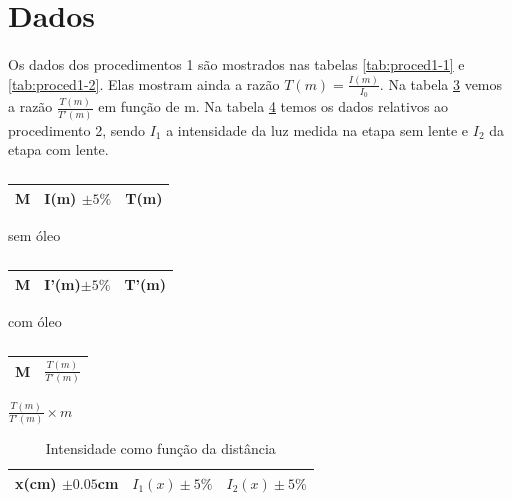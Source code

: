 \documentclass[a4paper,11pt]{article}
\begin{document}
\section{Dados}
\paragraph{}Os dados dos procedimentos 1 são mostrados nas tabelas \ref{tab:proced1-1} e \ref{tab:proced1-2}. Elas mostram ainda a razão $T(m) = \frac{I(m)}{I_0}$. Na tabela \ref{tab:proced1-3} vemos a razão $\frac{T(m)}{T'(m)}$ em função de m. Na tabela \ref{tal:proced2-1} temos os dados relativos ao procedimento 2, sendo $I_1$ a intensidade da luz medida na etapa sem lente e $I_2$ da etapa com lente.

\begin{table}[!htp]
\centering
	\begin{minipage}{0.3\textwidth}
			\begin{tabular}{|c|c|c|} \hline
				M & I(m) $\pm 5 \% $ & T(m) \\ \hline
				
			\end{tabular}
			\caption{sem óleo}	
			\label{tab:proced1-1}
	\end{minipage}
	\hspace{1.0 cm}
	\begin{minipage}{0.3\textwidth}
			\begin{tabular}{|c|c|c|}\hline
			M & I'(m)$ \pm 5\% $ & T'(m) \\ \hline
			
			\end{tabular}
			\caption{com óleo}
			\label{tab:proced1-2}
	\end{minipage}

\hspace{-4.5 cm}
	\begin{minipage}{0.3\textwidth}
			\begin{tabular}{|c|c|}\hline
			M & $\frac{T(m)}{T'(m)}$  \\ \hline
			
			\end{tabular}
			\caption{$\frac{T(m)}{T'(m)} \times m$}
			\label{tab:proced1-3}
	\end{minipage}	
	\caption*{}
\end{table}

\begin{table}
	\centering
	\begin{tabular}{|c|c|c|} \hline
		x(cm) $\pm 0.05$cm & $I_1(x) \pm 5\%$ & $I_2(x) \pm 5\%$ \\ \hline		
		
	\end{tabular}
	\caption{Intensidade como função da distância}
	\label{tal:proced2-1}
\end{table}
\end{document}
